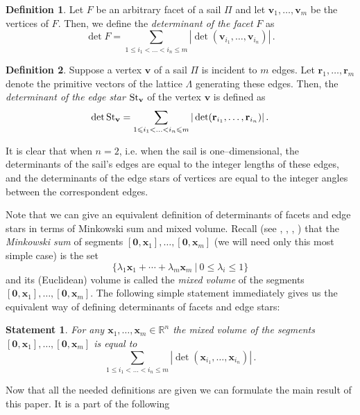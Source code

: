 \documentclass[11pt]{article}
\theoremstyle{definition}
\newtheorem{definition}{Definition}
\theoremstyle{remark}
\theoremstyle{plain}
\newtheorem{statement}{Statement}
\renewcommand{\vec}[1]{\mathbf{#1}}
\renewcommand{\leq}{\leqslant}
\newcommand{\starv}{\textup{St}_{\vec v}}
\newcommand{\sail}{\Pi}
\newcommand{\La}{\Lambda}
\newcommand{\R}{\mathbb{R}}
\begin{document}
  \begin{definition} \label{d:detF}
    Let $F$ be an arbitrary facet of a sail $\sail$ and let $\vec v_1,\ldots,\vec v_m$ be
    the vertices of $F$. Then, we define the \emph{determinant of the facet} $F$ as
    \[ \det F=
       \sum_{1\leq i_1<\ldots<i_n\leq m}|\det(\vec v_{i_1},\ldots,\vec v_{i_n})|\,. \]
  \end{definition}

  \begin{definition} \label{d:detStv}
    Suppose a vertex $\vec v$ of a sail $\sail$ is incident to $m$ edges. Let
    $\vec r_1,\ldots,\vec r_m$ denote the primitive vectors of the lattice $\La$ generating
    these edges. Then, the \emph{determinant of the edge star} $\starv$ of the vertex
    $\vec v$ is defined as
    \[ \det\starv=
       \sum_{1\leq i_1<\ldots<i_n\leq m}|\det(\vec r_{i_1},\ldots,\vec r_{i_n})|\,. \]
  \end{definition}

  It is clear that when $n=2$, i.e. when the sail is one--dimensional,
  the determinants of the sail's edges are equal to the integer lengths
  of these edges, and the determinants of the edge stars of vertices are
  equal to the integer angles between the correspondent edges.

  Note that we can give an equivalent definition of determinants of facets and edge stars in
  terms of Minkowski sum and mixed volume. Recall (see \cite{bonnesen_fenchel},
  \cite{grunbaum}, \cite{mcmullen_shephard}, \cite{ewald}) that the \emph{Minkowski sum} of
  segments $[\vec 0,\vec x_1],\ldots,[\vec 0,\vec x_m]$ (we will need only this most simple
  case) is the set
  \[ \{ \lambda_1\vec x_1+\cdots+\lambda_m\vec x_m\ |\ 0\leq\lambda_i\leq 1 \} \]
  and its (Euclidean) volume is called the \emph{mixed volume} of the segments
  $[\vec 0,\vec x_1],\ldots,[\vec 0,\vec x_m]$. The following simple statement immediately
  gives us the equivalent way of defining determinants of facets and edge stars:

  \begin{statement}
    For any $\vec x_1,\ldots,\vec x_m\in\R^n$ the mixed volume of the segments
    $[\vec 0,\vec x_1],\ldots,[\vec 0,\vec x_m]$ is equal to
    \[ \sum_{1\leq i_1<\ldots<i_n\leq m}|\det(\vec x_{i_1},\ldots,\vec x_{i_n})|\,. \]
  \end{statement}

  Now that all the needed definitions are given we can formulate the main result of this
  paper. It is a part of the following
\end{document}

